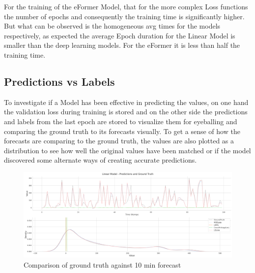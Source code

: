 \documentclass{article}
\begin{document}
For the training of the eFormer Model, that for the more complex Loss functions the number of epochs and consequently the training time is significantly higher. But what can be observed is the homogeneous avg times for the models respectively, as expected the average Epoch duration for the Linear Model is smaller than the deep learning models. For the eFormer it is less than half the training time. 

\subsection{Predictions vs Labels}

To investigate if a Model has been effective in predicting the values, on one hand the validation loss during training is stored and on the other side the predictions and labels from the last epoch are stored to visualize them for eyeballing and comparing the ground truth to its forecasts visually. To get a sense of how the forecasts are comparing to the ground truth, the values are also plotted as a distribution to see how well the original values have been matched or if the model discovered some alternate ways of creating accurate predictions. 

\begin{figure}
    \centering
    \includegraphics[width=\linewidth]{graphs/results/Linear_model_analysis.png}
    \caption{Comparison of ground truth against 10 min forecast}
    \label{fig:Linear_f1}
\end{figure}

\newpage

\printbibliography
\end{document}
